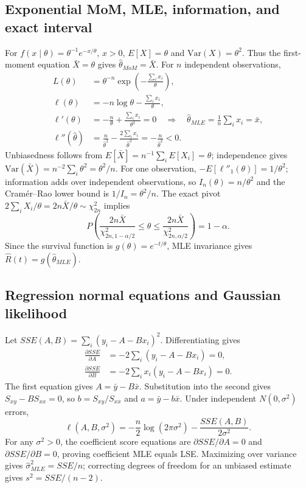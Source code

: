 \documentclass[11pt,a4paper]{article}
\begin{document}
\subsection*{Exponential MoM, MLE, information, and exact interval}
For $f(x\mid\theta)=\theta^{-1}e^{-x/\theta}$, $x>0$, $E[X]=\theta$ and $\mathrm{Var}(X)=\theta^2$. Thus the first-moment equation $\bar X=\theta$ gives $\hat\theta_{MoM}=\bar X$. For $n$ independent observations,
\begin{align*}
L(\theta)&=\theta^{-n}\exp\!\left(-\frac{\sum_i x_i}{\theta}\right),\\
\ell(\theta)&=-n\log\theta-\frac{\sum_i x_i}{\theta},\\
\ell'(\theta)&=-\frac n\theta+\frac{\sum_i x_i}{\theta^2}=0
\quad\Longrightarrow\quad\hat\theta_{MLE}=\frac1n\sum_i x_i=\bar x,\\
\ell''(\hat\theta)&=\frac n{\hat\theta^2}-\frac{2\sum_i x_i}{\hat\theta^3}
=-\frac n{\hat\theta^2}<0.
\end{align*}
Unbiasedness follows from $E[\bar X]=n^{-1}\sum_i E[X_i]=\theta$; independence gives $\mathrm{Var}(\bar X)=n^{-2}\sum_i\theta^2=\theta^2/n$. For one observation, $-E[\ell''_1(\theta)]=1/\theta^2$; information adds over independent observations, so $I_n(\theta)=n/\theta^2$ and the Cram\'er--Rao lower bound is $1/I_n=\theta^2/n$. The exact pivot $2\sum_i X_i/\theta=2n\bar X/\theta\sim\chi^2_{2n}$ implies
\begin{equation*}
P\!\left(\frac{2n\bar X}{\chi^2_{2n,1-\alpha/2}}
\le\theta\le
\frac{2n\bar X}{\chi^2_{2n,\alpha/2}}\right)=1-\alpha.
\end{equation*}
Since the survival function is $g(\theta)=e^{-t/\theta}$, MLE invariance gives $\hat R(t)=g(\hat\theta_{MLE})$.

\subsection*{Regression normal equations and Gaussian likelihood}
Let $SSE(A,B)=\sum_i(y_i-A-Bx_i)^2$. Differentiating gives
\begin{align*}
\frac{\partial SSE}{\partial A}&=-2\sum_i(y_i-A-Bx_i)=0,\\
\frac{\partial SSE}{\partial B}&=-2\sum_i x_i(y_i-A-Bx_i)=0.
\end{align*}
The first equation gives $A=\bar y-B\bar x$. Substitution into the second gives $S_{xy}-B S_{xx}=0$, so $b=S_{xy}/S_{xx}$ and $a=\bar y-b\bar x$. Under independent $N(0,\sigma^2)$ errors,
\begin{equation*}
\ell(A,B,\sigma^2)=-\frac n2\log(2\pi\sigma^2)-\frac{SSE(A,B)}{2\sigma^2}.
\end{equation*}
For any $\sigma^2>0$, the coefficient score equations are $\partial SSE/\partial A=0$ and $\partial SSE/\partial B=0$, proving coefficient MLE equals LSE. Maximizing over variance gives $\hat\sigma^2_{MLE}=SSE/n$; correcting degrees of freedom for an unbiased estimate gives $s^2=SSE/(n-2)$.
\end{document}
